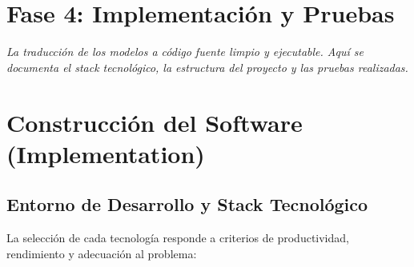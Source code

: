 \documentclass[12pt, a4paper]{article}
\begin{document}
\newpage
\section*{Fase 4: Implementación y Pruebas}

\textit{La traducción de los modelos a código fuente limpio y ejecutable. Aquí se documenta el stack tecnológico, la estructura del proyecto y las pruebas realizadas.}

\section{Construcción del Software (Implementation)}

\subsection{Entorno de Desarrollo y Stack Tecnológico}

La selección de cada tecnología responde a criterios de productividad, rendimiento y adecuación al problema:
\end{document}
